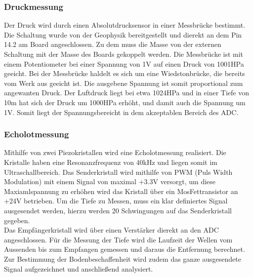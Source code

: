 \documentclass[12pt,a4paper,titlepage,headinclude,bibtotoc]{scrartcl}
\begin{document}
\subsubsection{Druckmessung}
Der Druck wird durch einen Absolutdrucksensor in einer Messbrücke bestimmt.
Die Schaltung wurde von der Geophysik bereitgestellt und dierekt an dem Pin 14.2 am Board angeschlossen.
Zu dem muss die Masse von der externen Schaltung mit der Masse des Boards gekoppelt werden.
Die Messbrücke ist mit einem Potentiometer bei einer Spannung von 1\si{\volt} auf einen Druck von 1001HPa geeicht.
Bei der Messbrücke haldelt es sich um  eine Wiedstonbrücke, die bereits vom Werk aus geeicht ist.
Die ausgebene Spannung ist somit proportional zum angewanten Druck.
Der Luftdruck liegt bei etwa 1024HPa und in einer Tiefe von 10\si{\meter} hat sich der Druck um 1000HPa erhöht, und damit auch die Spannung um 1\si{\volt}.
Somit liegt der Spannungsbereicht in dem akzeptablen Bereich des ADC.

\subsubsection{Echolotmessung}
Mithilfe von zwei Piezokristallen wird eine Echolotmessung realisiert.
Die Kristalle haben eine Resonanzfrequenz von 40\si{\kilo\hertz} und liegen somit im Ultraschallbereich.
Das Senderkristall wird mithilfe von PWM (Puls Width Modulation) mit einem Signal von maximal +3.3\si{\volt} versorgt, um diese Maxiamlspannung zu erhöhen wird das Kristall über ein MosFettransistor an +24\si{\volt} betrieben.%
Um die Tiefe zu Messen, muss ein klar definiertes Signal ausgesendet werden, hierzu werden 20 Schwingungen auf das Senderkristall gegeben.\\
Das Empfängerkristall wird über einen Verstärker dierekt an den ADC angeschlossen.
Für die Messung der Tiefe wird die Laufzeit der Wellen vom Aussenden bis zum Empfangen gemessen und daraus die Entfernung berechnet.
Zur Bestimmung der Bodenbeschaffenheit wird zudem das ganze ausgesendete Signal aufgezeichnet und anschließend analysiert.
\end{document}
